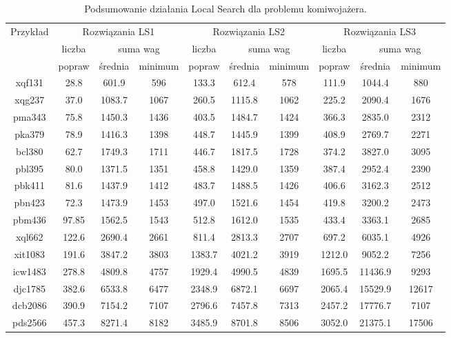 \documentclass{article}
\begin{document}
\begin{table}[h!]
    \centering
    \begin{tabular}{|c|c|c|c|c|c|c|c|c|c|}
        \hline
        \multirow{3}{*}{Przykład} & \multicolumn{3}{|c|}{Rozwiązania LS1} & \multicolumn{3}{|c|}{Rozwiązania LS2}  & \multicolumn{3}{|c|}{Rozwiązania LS3}  \\
        \cline{2-10}
        & liczba & \multicolumn{2}{c|}{suma wag} & liczba & \multicolumn{2}{c|}{suma wag} & liczba & \multicolumn{2}{c|}{suma wag} \\
        \cline{3-4} \cline{6-7} \cline{9-10}
        & popraw & średnia & minimum & popraw & średnia & minimum & popraw & średnia & minimum \\
        \hline
        xqf131 & 28.8 & 601.9 & 596 & 133.3 & 612.4 & 578 & 111.9 & 1044.4 &  880 \\
        \hline
        xqg237 & 37.0 & 1083.7 & 1067 & 260.5 & 1115.8 & 1062 & 225.2 & 2090.4 &  1676 \\
        \hline
        pma343 & 75.8 & 1450.3 & 1436 & 403.5 & 1484.7 & 1424 & 366.3 & 2835.0 &  2312 \\
        \hline
        pka379 & 78.9 & 1416.3 & 1398 & 448.7 & 1445.9 & 1399 & 408.9 & 2769.7 &  2271 \\
        \hline
        bcl380 & 62.7 & 1749.3 & 1711 & 446.7 & 1817.5 & 1728 & 374.2 & 3827.0 &  3095 \\
        \hline
        pbl395 & 80.0 & 1371.5 & 1351 & 458.8 & 1429.0 & 1359 & 387.4 & 2952.4 &  2390 \\
        \hline
        pbk411 & 81.6 & 1437.9 & 1412 & 483.7 & 1488.5 & 1426 & 406.6 & 3162.3 &  2512 \\
        \hline
        pbn423 & 72.3 & 1473.9 & 1453 & 497.0 & 1521.6 & 1454 & 419.8 & 3200.2 & 2473 \\
        \hline
        pbm436 & 97.85 & 1562.5 & 1543 & 512.8 & 1612.0 & 1535 & 433.4 & 3363.1 & 2685 \\
        \hline
        xql662 & 122.6 & 2690.4 & 2661 & 811.4 & 2813.3 & 2707 & 697.2 & 6035.1 & 4926 \\
        \hline
        xit1083 & 191.6 & 3847.2 & 3803 & 1383.7 & 4021.2 & 3919 & 1212.0 & 9052.2 & 7256 \\
        \hline
        icw1483 & 278.8 & 4809.8 & 4757 & 1929.4 & 4990.5 & 4839 & 1695.5 & 11436.9 & 9293 \\
        \hline
        djc1785 & 382.6 & 6533.8 & 6477 & 2348.9 & 6872.1 & 6697 & 2065.4 & 15529.9 & 12617 \\
        \hline
        dcb2086 & 390.9 & 7154.2 & 7107 & 2796.6 & 7457.8 & 7313 & 2457.2 & 17776.7 & 7107 \\
        \hline
        pds2566 & 457.3 & 8271.4 & 8182 & 3485.9 & 8701.8 & 8506 & 3052.0 & 21375.1 & 17506 \\
        \hline
    \end{tabular}
    \caption{Podsumowanie działania Local Search dla problemu komiwojażera.}
\end{table}
\end{document}
